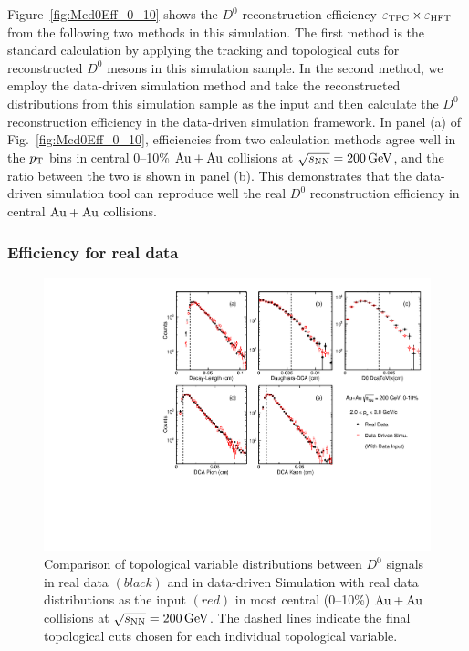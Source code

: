\documentclass[%
 reprint,	
 amsmath,amssymb,
 aps,
 prc,
]{revtex4-1}
\begin{document}
Figure~\ref{fig:Mcd0Eff_0_10} shows the $D^0$ reconstruction efficiency $\varepsilon_{\rm TPC}\times\varepsilon_{\rm HFT}$ from the following two methods in this simulation. The first method is the standard calculation by applying the tracking and topological cuts for reconstructed $D^0$ mesons in this simulation sample. In the second method, we employ the data-driven simulation method and take the reconstructed distributions from this simulation sample as the input and then calculate the $D^0$ reconstruction efficiency in the data-driven simulation framework. In panel (a) of Fig.~\ref{fig:Mcd0Eff_0_10}, efficiencies from two calculation methods agree well in the $p_{\rm T}$ bins in central 0--10\% ${\rm{Au + Au}}$ collisions at ${\sqrt{s_{\rm NN}} = \rm{200\,GeV}}$, and the ratio between the two is shown in panel (b). This demonstrates that the data-driven simulation tool can reproduce well the real $D^0$ reconstruction efficiency in central ${\rm{Au + Au}}$ collisions.


\subsubsection{\label{sec:correction:hft:fordata}Efficiency for real data}

\begin{figure}
\centering
\includegraphics[width=1.0\textwidth]{fig/DataTopo.pdf}
\caption{Comparison of topological variable distributions between $D^0$ signals in real data $(black)$ and in data-driven Simulation with real data distributions as the input $(red)$ in most central (0--10\%) ${\rm{Au + Au}}$ collisions at ${\sqrt{s_{\rm NN}} = \rm{200\,GeV}}$. The dashed lines indicate the final topological cuts chosen for each individual topological variable.}
\label{fig:DataTopo} 
\end{figure}
\end{document}
